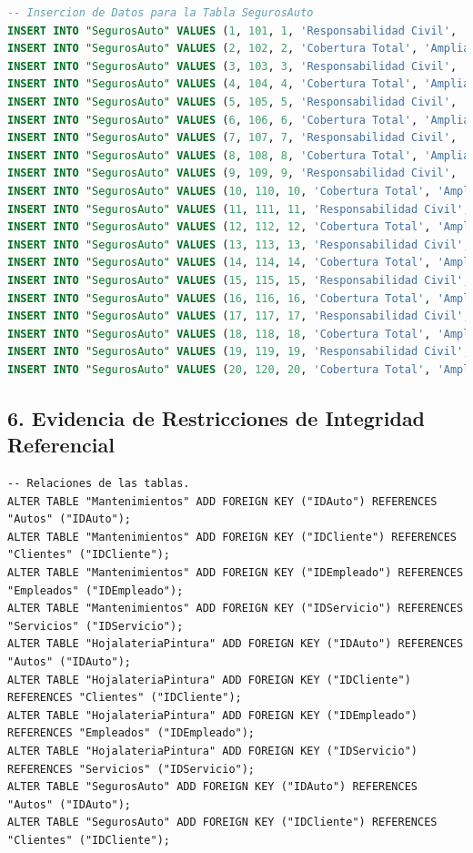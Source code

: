\documentclass[12pt]{article}
\begin{document}
\begin{lstlisting}[language=SQL]
-- Insercion de Datos para la Tabla SegurosAuto
INSERT INTO "SegurosAuto" VALUES (1, 101, 1, 'Responsabilidad Civil', 'Basica', 300.00);
INSERT INTO "SegurosAuto" VALUES (2, 102, 2, 'Cobertura Total', 'Amplia', 700.00);
INSERT INTO "SegurosAuto" VALUES (3, 103, 3, 'Responsabilidad Civil', 'Basica', 320.00);
INSERT INTO "SegurosAuto" VALUES (4, 104, 4, 'Cobertura Total', 'Amplia', 750.00);
INSERT INTO "SegurosAuto" VALUES (5, 105, 5, 'Responsabilidad Civil', 'Basica', 310.00);
INSERT INTO "SegurosAuto" VALUES (6, 106, 6, 'Cobertura Total', 'Amplia', 720.00);
INSERT INTO "SegurosAuto" VALUES (7, 107, 7, 'Responsabilidad Civil', 'Basica', 330.00);
INSERT INTO "SegurosAuto" VALUES (8, 108, 8, 'Cobertura Total', 'Amplia', 680.00);
INSERT INTO "SegurosAuto" VALUES (9, 109, 9, 'Responsabilidad Civil', 'Basica', 340.00);
INSERT INTO "SegurosAuto" VALUES (10, 110, 10, 'Cobertura Total', 'Amplia', 710.00);
INSERT INTO "SegurosAuto" VALUES (11, 111, 11, 'Responsabilidad Civil', 'Basica', 325.00);
INSERT INTO "SegurosAuto" VALUES (12, 112, 12, 'Cobertura Total', 'Amplia', 730.00);
INSERT INTO "SegurosAuto" VALUES (13, 113, 13, 'Responsabilidad Civil', 'Basica', 315.00);
INSERT INTO "SegurosAuto" VALUES (14, 114, 14, 'Cobertura Total', 'Amplia', 690.00);
INSERT INTO "SegurosAuto" VALUES (15, 115, 15, 'Responsabilidad Civil', 'Basica', 335.00);
INSERT INTO "SegurosAuto" VALUES (16, 116, 16, 'Cobertura Total', 'Amplia', 740.00);
INSERT INTO "SegurosAuto" VALUES (17, 117, 17, 'Responsabilidad Civil', 'Basica', 305.00);
INSERT INTO "SegurosAuto" VALUES (18, 118, 18, 'Cobertura Total', 'Amplia', 770.00);
INSERT INTO "SegurosAuto" VALUES (19, 119, 19, 'Responsabilidad Civil', 'Basica', 310.00);
INSERT INTO "SegurosAuto" VALUES (20, 120, 20, 'Cobertura Total', 'Amplia', 700.00);
    \end{lstlisting}    

    \subsection*{6. Evidencia de Restricciones de Integridad Referencial}
    \begin{lstlisting}
-- Relaciones de las tablas.
ALTER TABLE "Mantenimientos" ADD FOREIGN KEY ("IDAuto") REFERENCES "Autos" ("IDAuto");
ALTER TABLE "Mantenimientos" ADD FOREIGN KEY ("IDCliente") REFERENCES "Clientes" ("IDCliente");
ALTER TABLE "Mantenimientos" ADD FOREIGN KEY ("IDEmpleado") REFERENCES "Empleados" ("IDEmpleado");
ALTER TABLE "Mantenimientos" ADD FOREIGN KEY ("IDServicio") REFERENCES "Servicios" ("IDServicio");
ALTER TABLE "HojalateriaPintura" ADD FOREIGN KEY ("IDAuto") REFERENCES "Autos" ("IDAuto");
ALTER TABLE "HojalateriaPintura" ADD FOREIGN KEY ("IDCliente") REFERENCES "Clientes" ("IDCliente");
ALTER TABLE "HojalateriaPintura" ADD FOREIGN KEY ("IDEmpleado") REFERENCES "Empleados" ("IDEmpleado");
ALTER TABLE "HojalateriaPintura" ADD FOREIGN KEY ("IDServicio") REFERENCES "Servicios" ("IDServicio");
ALTER TABLE "SegurosAuto" ADD FOREIGN KEY ("IDAuto") REFERENCES "Autos" ("IDAuto");
ALTER TABLE "SegurosAuto" ADD FOREIGN KEY ("IDCliente") REFERENCES "Clientes" ("IDCliente");
    \end{lstlisting}
\end{document}
